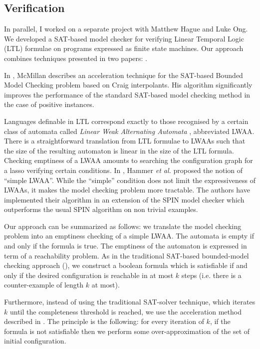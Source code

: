 \subsection{Verification}

In parallel, I worked on a separate project with Matthew Hague and
Luke Ong. We developed a SAT-based  model checker for verifying
Linear Temporal Logic (LTL) formulae on programs expressed as finite
state machines. Our approach combines techniques presented in two
papers: \cite{hammer:truly, DBLP:conf/cav/McMillan03}.

In \cite{DBLP:conf/cav/McMillan03}, McMillan describes an
acceleration technique for the SAT-based Bounded Model Checking
problem based on Craig interpolants. His algorithm significantly
improves the performance of the standard SAT-based model checking
method in the case of positive instances.


Languages definable in LTL correspond exactly to those recognised by a certain class of automata called \emph{Linear Weak Alternating Automata} \citep{thomas97languages}, abbreviated LWAA. 
There is a straightforward translation from LTL formulae to LWAAs such that the size of the resulting automaton is linear in the size of the LTL formula. Checking emptiness of a LWAA amounts to searching the configuration graph for a lasso verifying certain conditions. In \citep{hammer:truly}, Hammer \emph{et al.} proposed the notion of ``simple LWAA''. While the ``simple'' condition does not limit the expressiveness of LWAAs, it makes the model checking problem more tractable. The authors have implemented their algorithm in an extension of the SPIN model checker which outperforms the usual SPIN algorithm on non trivial examples.


Our approach can be summarized as follows: we translate the model checking problem into an emptiness checking of a simple LWAA. The automata is empty if and only if the formula is true. The emptiness of the automaton is expressed in term of a reachability problem. As in the
traditional SAT-based bounded-model checking approach
(\cite{biere99symbolic}), we construct a boolean formula which is
satisfiable if and only if the desired configuration is reachable in
at most $k$ steps (i.e. there is a counter-example of length $k$ at
most).

Furthermore, instead of using the traditional SAT-solver technique,
which iterates $k$ until the completeness threshold is reached, we
use the acceleration method described in
\cite{DBLP:conf/cav/McMillan03}. The principle is the following: for
every iteration of $k$, if the formula is not satisfiable then we
perform some over-approximation of the set of initial configuration.

